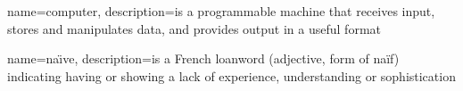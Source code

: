 
{
  name=computer,
  description={is a programmable machine that receives input,
               stores and manipulates data, and provides
               output in a useful format}
}

{
  name=na\"{\i}ve,
  description={is a French loanword (adjective, form of naïf)
               indicating having or showing a lack of experience,
               understanding or sophistication}
}

